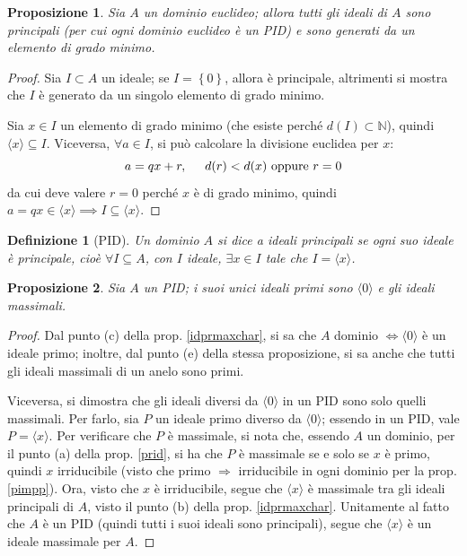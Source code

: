 \documentclass[12pt]{scrartcl}
\theoremstyle{style}
\newtheorem{definizione}{Definizione}[section]
\newtheorem{prop}{Proposizione}[section]
\numberwithin{equation}{subsection}
\begin{document}
\begin{prop}
	Sia $A$ un dominio euclideo; allora tutti gli ideali di $A$ sono principali (per cui ogni dominio euclideo \`e un PID) e sono generati da un elemento di grado minimo.
\end{prop}
	\begin{proof}
		Sia $I \subset A$ un ideale; se $I=\left\{ 0 \right\} $, allora \`e principale, altrimenti si mostra che $I$ \`e generato da un singolo elemento di grado minimo.

		Sia $x \in I$ un elemento di grado minimo (che esiste perch\'e $d(I) \subset \mathbb{N}$), quindi $\langle x \rangle\subseteq I$.
		Viceversa, $\forall a \in I$, si pu\`o calcolare la divisione euclidea per $x$:
		\[
		a = qx + r , \hspace{.5cm} d(r) < d(x) \text{ oppure } r=0
		\] 
		da cui deve valere $r=0$ perch\'e $x$ \`e di grado minimo, quindi $a=qx \in \langle x \rangle \implies I \subseteq \langle x \rangle$.
	\end{proof}
\begin{definizione}
	[PID]
	Un dominio $A$ si dice \textit{a ideali principali} se ogni suo ideale \`e principale, cio\`e $\forall I \subseteq A$, con $I$ ideale, $\exists x \in I $ tale che $I = \langle x \rangle$.
\end{definizione}
\begin{prop}\label{pideals}
	Sia $A$ un PID; i suoi unici ideali primi sono $\langle 0 \rangle$ e gli ideali massimali.
\end{prop}
	\begin{proof}
		Dal punto (c) della prop. \ref{idprmaxchar}, si sa che $A$ dominio $\iff \langle 0 \rangle$ \`e un ideale primo; inoltre, dal punto (e) della stessa proposizione, si sa anche che tutti gli ideali massimali di un anelo sono primi.

		Viceversa, si dimostra che gli ideali diversi da $\langle 0 \rangle $ in un PID sono solo quelli massimali.
		Per farlo, sia $P$ un ideale primo diverso da $\langle 0 \rangle$; essendo  in un PID, vale $P=\langle x \rangle$.
		Per verificare che $P$ \`e massimale, si nota che, essendo $A$ un dominio, per il punto (a) della prop. \ref{prid}, si ha che $P$ \`e massimale se e solo se $x$ \`e primo, quindi $x$ irriducibile (visto che primo $\Rightarrow $ irriducibile in ogni dominio per la prop. \ref{pimpp}).
		Ora, visto che $x$ \`e irriducibile, segue che $\langle x \rangle$ \`e massimale tra gli ideali principali di $A$, visto il punto (b) della prop. \ref{idprmaxchar}.
		Unitamente al fatto che $A$ \`e un PID (quindi tutti i suoi ideali sono principali), segue che $\langle x \rangle$ \`e un ideale massimale per $A$.
	\end{proof}
\end{document}
